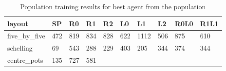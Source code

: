 \begin{table}[t]
\caption{ Population training results for best agent from the population }
\begin{center}
\begin{tabular}{llllllllll}

\textbf{layout}

    & \textbf{ SP }

    & \textbf{ R0 }

    & \textbf{ R1 }

    & \textbf{ R2 }

    & \textbf{ L0 }

    & \textbf{ L1 }

    & \textbf{ L2 }

    & \textbf{ R0L0 }

    & \textbf{ R1L1 }
 \\ \hline


        five\_by\_five
        
           & 472
        
           & 819
        
           & 834
        
           & 828
        
           & 622
        
           & 1112
        
           & 506
        
           & 875
        
           & 610
         \\

        schelling
        
           & 69
        
           & 543
        
           & 288
        
           & 229
        
           & 403
        
           & 205
        
           & 344
        
           & 374
        
           & 344
         \\

        centre\_pots
        
           & 135
        
           & 727
        
           & 581
        

\end{tabular}
\end{center}
\end{table}
